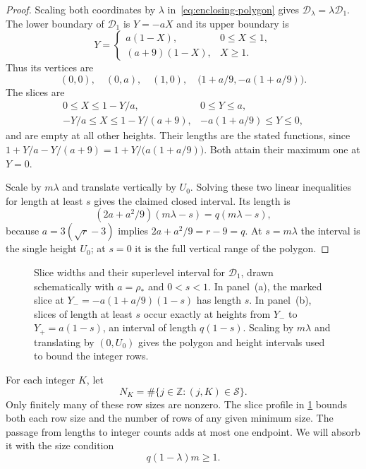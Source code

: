 \begin{proof}
Scaling both coordinates by $\lambda$ in~\eqref{eq:enclosing-polygon} gives $\mathcal{D}_\lambda=\lambda\mathcal{D}_1$. The lower boundary of $\mathcal{D}_1$ is $Y=-aX$ and its upper boundary is
\[
 Y=\begin{cases}
 a(1-X),&0\le X\le1,\\
 (a+9)(1-X),&X\ge1.
 \end{cases}
\]
Thus its vertices are
\[
 (0,0),\quad(0,a),\quad(1,0),\quad
 \bigl(1+a/9,-a(1+a/9)\bigr).
\]
The slices are
\[
 \begin{array}{ll}
 0\le X\le1-Y/a,&0\le Y\le a,\\[1mm]
 -Y/a\le X\le1-Y/(a+9),&-a(1+a/9)\le Y\le0,
 \end{array}
\]
and are empty at all other heights. Their lengths are the stated functions, since $1+Y/a-Y/(a+9)=1+Y/\bigl(a(1+a/9)\bigr)$. Both attain their maximum one at $Y=0$.

Scale by $m\lambda$ and translate vertically by $U_0$. Solving these two linear inequalities for length at least $s$ gives the claimed closed interval. Its length is
\[
 (2a+a^2/9)(m\lambda-s)=q(m\lambda-s),
\]
because $a=3(\sqrt r-3)$ implies $2a+a^2/9=r-9=q$. At $s=m\lambda$ the interval is the single height $U_0$; at $s=0$ it is the full vertical range of the polygon.
\end{proof}

\begin{figure}[htbp]
 \centering
 
 \caption{Slice widths and their superlevel interval for
 $\mathcal{D}_1$, drawn schematically with $a=\rho_*$ and
 $0<s<1$. In panel~(a), the marked slice at
 $Y_-=-a(1+a/9)(1-s)$ has length $s$. In panel~(b), slices of
 length at least $s$ occur exactly at heights from $Y_-$ to
 $Y_+=a(1-s)$, an interval of length $q(1-s)$.
 Scaling by $m\lambda$ and translating by $(0,U_0)$ gives the
 polygon and height intervals used to bound the integer rows.}
 \label{fig:slice-profile}
\end{figure}

For each integer $K$, let
\[
 N_K=\#\{j\in\mathbb{Z}:(j,K)\in\mathcal{S}\}.
\]
Only finitely many of these row sizes are nonzero. The slice profile in \cref{fig:slice-profile} bounds both each row size and the number of rows of any given minimum size. The passage from lengths to integer counts adds at most one endpoint. We will absorb it with the size condition
\begin{equation}\label{eq:scaling}
 q(1-\lambda)m\ge1.
\end{equation}

